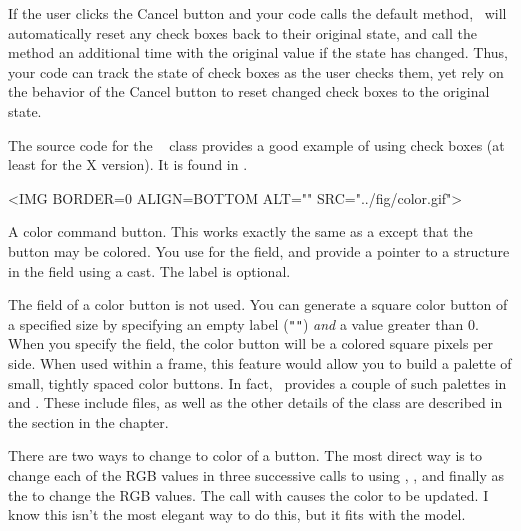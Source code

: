 If the user clicks the Cancel button and your code calls the
default  method, \V\ will automatically reset
any check boxes back to their original state, and call the
 method an additional time with the original
value if the state has changed.  Thus, your code can track the
state of check boxes as the user checks them, yet rely on the
behavior of the Cancel button to reset changed check boxes to the
original state.

The source code for the \V\  class provides a
good example of using check boxes (at least for the X version).
It is found in .


\small
\begin{rawhtml}
<IMG BORDER=0 ALIGN=BOTTOM ALT="" SRC="../fig/color.gif">
\end{rawhtml}
\begin{latexonly}

\end{latexonly}
\normalfont\normalsize
\vspace{.1in}

A color command button. This works exactly the same as a 
except that the button may be colored. You use 
for the  field, and provide a pointer to a 
structure in the  field using a 
cast. The label is optional.

The  field of a color button is not used. You can
generate a square color button of a specified size by specifying
an empty label (\verb+""+) \emph{and} a  value greater
than 0. When you specify the  field,  the color button
will be a colored square  pixels per side. When used
within a  frame, this feature would allow you
to build a palette of small, tightly spaced color buttons. In
fact, \V\ provides a couple of such palettes in 
 and . These
include files, as well as the other details of the 
class are described in the section  in the 
chapter.

There are two ways to change to color of a button. The most direct
way is to change each of the RGB values in three successive calls
to  using , , and finally
 as the  to change the RGB values. 
The call with  causes the color to be updated. I know
this isn't the most elegant way to do this, but it fits with the
 model.

